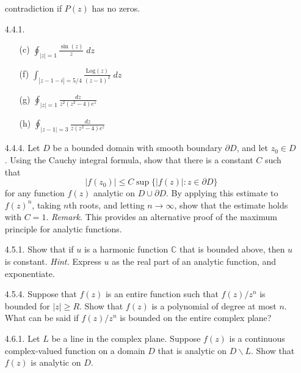 \documentclass[9pt]{article}
\newcommand{\C}{\mathbb{C}}
\begin{document}
\begin{enumerate}
                  contradiction if $P(z)$ has no zeros.
   \item[4.4.1.]  \begin{enumerate}
                     \item[(c)]  $\oint_{|z|=1} \frac{\sin(z)}{z}\;dz$
                     \item[(f)]  $\int_{|z-1-i|=5/4}
                                  \frac{\text{Log}(z)}{(z-1)^2}\;dz$
                     \item[(g)]  $\oint_{|z|=1} \frac{dz}{z^2(z^2-4)e^z}$
                     \item[(h)]  $\oint_{|z-1|=3} \frac{dz}{z(z^2-4)e^z}$
                     
                  \end{enumerate}
   \item[4.4.4.]  Let $D$ be a bounded domain with smooth boundary $\partial D$,
                  and let $z_0 \in D$. Using the Cauchy integral formula, show
                  that there is a constant $C$ such that
                  $$|f(z_0)| \le C \sup\{|f(z)| : z \in \partial D\}$$
                  for any function $f(z)$ analytic on $D\cup\partial D$. By
                  applying this estimate to $f(z)^n$, taking $n$th roots, and
                  letting $n \rightarrow \infty$, show that the estimate holds
                  with $C = 1$. \textit{Remark.} This provides an alternative
                  proof of the maximum principle for analytic functions.
   \item[4.5.1.]  Show that if $u$ is a harmonic function $\C$ that is bounded
                  above, then $u$ is constant. \textit{Hint.} Express $u$ as the
                  real part of an analytic function, and exponentiate.
   \item[4.5.4.]  Suppose that $f(z)$ is an entire function such that $f(z)/z^n$
                  is bounded for $|z| \ge R$. Show that $f(z)$ is a polynomial
                  of degree at most $n$. What can be said if $f(z)/z^n$ is
                  bounded on the entire complex plane?
   \item[4.6.1.]  Let $L$ be a line in the complex plane. Suppose $f(z)$ is a
                  continuous complex-valued function on a domain $D$ that is
                  analytic on $D\backslash L$. Show that $f(z)$ is analytic on
                  $D$.
\end{enumerate}
\end{document}
